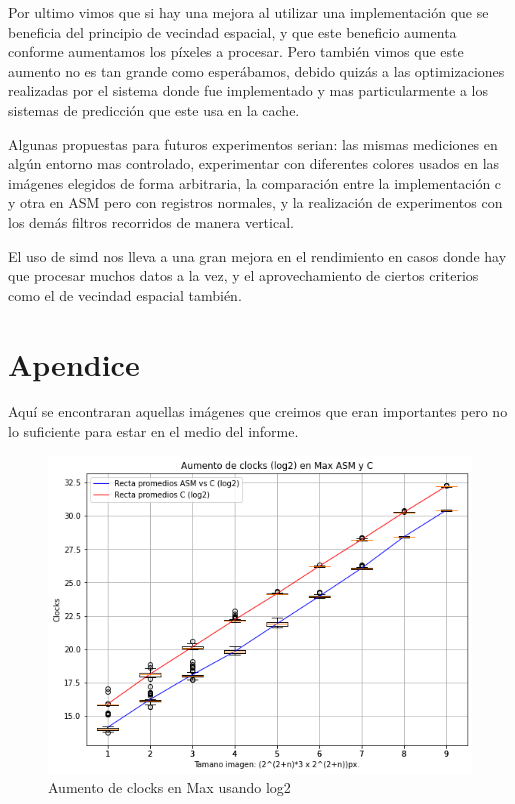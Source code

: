 \documentclass[a4paper]{article}
\begin{document}
Por ultimo vimos que si hay una mejora al utilizar una implementación que se beneficia del principio de vecindad espacial, y que este beneficio aumenta conforme aumentamos los píxeles a procesar. Pero también vimos que este aumento no es tan grande como esperábamos, debido quizás a las optimizaciones realizadas por el sistema donde fue implementado y mas particularmente a los sistemas de predicción que este usa en la cache.

Algunas propuestas para futuros experimentos serian: las mismas mediciones en algún entorno mas controlado, experimentar con diferentes colores usados en las imágenes elegidos de forma arbitraria, la comparación entre la implementación c y otra en ASM pero con registros normales, y la realización de experimentos con los demás filtros recorridos de manera vertical.

El uso de simd nos lleva a una gran mejora en el rendimiento en casos donde hay que procesar muchos datos a la vez, y el aprovechamiento de ciertos criterios como el de vecindad espacial también.

\section{Apendice}
Aquí se encontraran aquellas imágenes que creimos que eran importantes pero no lo suficiente para estar en el medio del informe.
\begin{figure}[htp]
    \centering
    \includegraphics[scale=.5]{log21.jpg}
    \caption{Aumento de clocks en Max usando log2}
    \label{fig:galaxy}
\end{figure}
\end{document}

